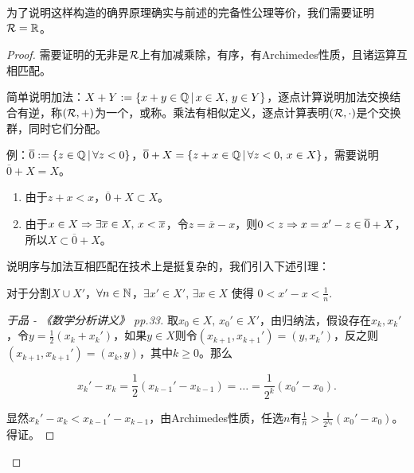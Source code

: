 \begin{proposition}
	
	为了说明这样构造的确界原理确实与前述的完备性公理等价，我们需要证明$\cal{R}=\RR$。
	
	\begin{proof}
		
		需要证明的无非是$\cal{R}$上有加减乘除，有序，有Archimedes性质，且诸运算互相匹配。
		
		简单说明加法：$X+Y := \{x+y\in\QQ\setvert x\in X,\, y\in Y\}$，逐点计算说明加法交换结合有逆，称$(\cal{R},+)$为一个，或称。乘法有相似定义，逐点计算表明$(\cal{R},\cdot)$是个交换群，同时它们分配。
		
		例：$\overline{0} := \{z\in\QQ\setvert \forall z<0\}$，$\overline{0}+X = \{z+x\in\QQ\setvert \forall z<0,\, x\in X\}$，需要说明$\overline{0}+X=X$。
		\begin{enumerate}
			\item 由于$z+x<x$，$\overline{0}+X\subset X$。
			
			\item 由于$x\in X\Rar \exists \overline{x}\in X,\, x<\overline{x}$，令$z=\overline{x}-x$，则$0<z \Rar x=x'-z\in\overline{0}+X$，所以$X\subset\overline{0}+X$。
		\end{enumerate}
		
		说明序与加法互相匹配在技术上是挺复杂的，我们引入下述引理：
		
		\begin{lemma}\label{lemma:1.1}
			
			对于分割$X\cup X'$，$\forall n\in\NN$，$\exists x'\in X',\, \exists x\in X$ 使得 $\displaystyle0<x'-x<\frac{1}{n}$.
			
			\begin{proof}[于品 - 《数学分析讲义》 pp.33]
				
				取$x_0\in X,\, x_0'\in X'$，由归纳法，假设存在$x_k,x_k'$，令$y=\frac{1}{2}(x_k+x_k')$，如果$y\in X$则令$(x_{k+1},x_{k+1}')=(y,x_k')$，反之则$(x_{k+1},x_{k+1}')=(x_k,y)$，其中$k\geqslant 0$。那么
				
				$$ x_k'-x_k = \frac{1}{2}(x_{k-1}'-x_{k-1}) = \ldots = \frac{1}{2^k}(x_0'-x_0). $$
				
				显然$x_k'-x_k<x_{k-1}'-x_{k-1}$，由Archimedes性质，任选$n$有$\displaystyle\frac{1}{n}>\frac{1}{2^{k_0}}(x_0'-x_0)$。得证。
				
			\end{proof}
			
		\end{lemma}
		

\end{proof}
\end{proposition}
